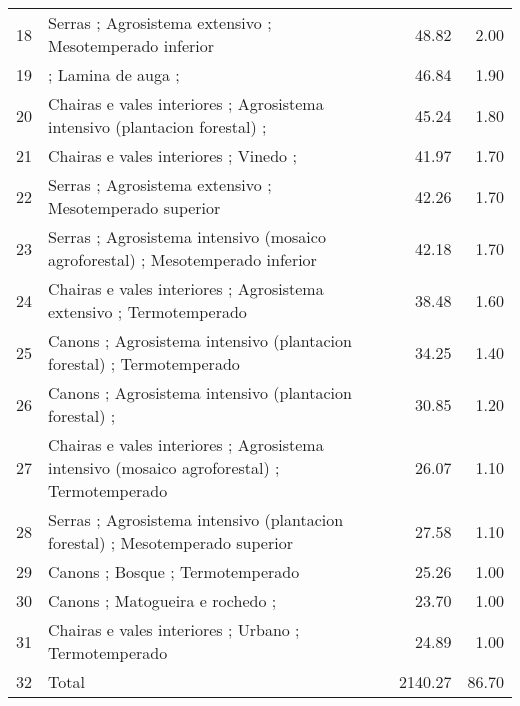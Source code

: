 \begin{table}[p]
\begin{tabular}{rlrr}
  18 & Serras ; Agrosistema extensivo ; Mesotemperado inferior & 48.82 & 2.00 \\ 
  19 &  ; Lamina de auga ;  & 46.84 & 1.90 \\ 
  20 & Chairas e vales interiores ; Agrosistema intensivo (plantacion forestal) ;  & 45.24 & 1.80 \\ 
  21 & Chairas e vales interiores ; Vinedo ;  & 41.97 & 1.70 \\ 
  22 & Serras ; Agrosistema extensivo ; Mesotemperado superior & 42.26 & 1.70 \\ 
  23 & Serras ; Agrosistema intensivo (mosaico agroforestal) ; Mesotemperado inferior & 42.18 & 1.70 \\ 
  24 & Chairas e vales interiores ; Agrosistema extensivo ; Termotemperado & 38.48 & 1.60 \\ 
  25 & Canons ; Agrosistema intensivo (plantacion forestal) ; Termotemperado & 34.25 & 1.40 \\ 
  26 & Canons ; Agrosistema intensivo (plantacion forestal) ;  & 30.85 & 1.20 \\ 
  27 & Chairas e vales interiores ; Agrosistema intensivo (mosaico agroforestal) ; Termotemperado & 26.07 & 1.10 \\ 
  28 & Serras ; Agrosistema intensivo (plantacion forestal) ; Mesotemperado superior & 27.58 & 1.10 \\ 
  29 & Canons ; Bosque ; Termotemperado & 25.26 & 1.00 \\ 
  30 & Canons ; Matogueira e rochedo ;  & 23.70 & 1.00 \\ 
  31 & Chairas e vales interiores ; Urbano ; Termotemperado & 24.89 & 1.00 \\ 
  32 & Total & 2140.27 & 86.70 \\ 
   \hline
\end{tabular}
\end{table}
